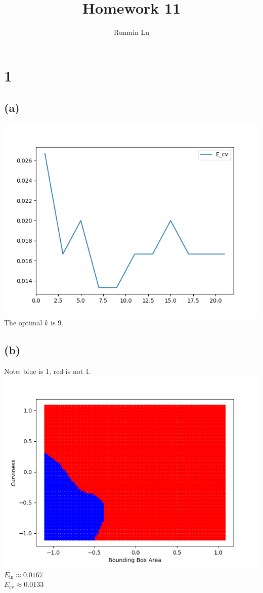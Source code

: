 \documentclass{article}
\title{Homework 11}
\author{Runmin Lu}
\begin{document}
	\maketitle
	
	\section*{1}
	\subsection*{(a)}
		\includegraphics[scale=0.8]{1a.png}\\
		The optimal $k$ is 9.
	\subsection*{(b)}
		Note: blue is 1, red is not 1.\\
		\includegraphics[scale=0.8]{1b.png}\\
		$E_\text{in} \approx 0.0167$\\
		$E_\text{cv} \approx 0.0133$
\end{document}
